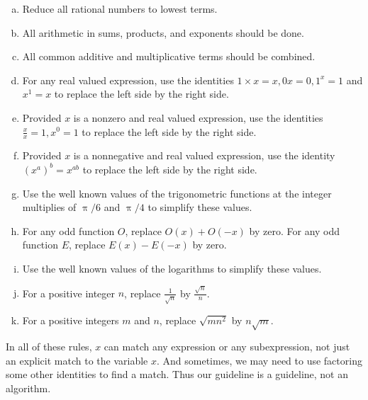 \documentclass[12pt,fleqn]{article}
\newenvironment{alphalist}{
  \begin{enumerate}[(a)]
    \addtolength{\itemsep}{-0.5\itemsep}}
  {\end{enumerate}}
\begin{document}
\begin{tcolorbox}
\begin{alphalist}

\item  Reduce all rational numbers to lowest terms.

\item All arithmetic in sums, products, and exponents should be done.

\item All common additive and multiplicative terms should be combined.

\item For any real valued expression, use the identities  $1 \times x   = x ,  0  x = 0, 1^x = 1$ and  $x^1 =x$ to replace the left side by the right side.

\item Provided $x$ is a nonzero and real valued expression,  use the identities $\frac{x}{x} = 1, x^0 = 1$ to replace the left side by the right side.

\item Provided $x$ is a nonnegative and real valued expression, use the identity $\left(x^a\right)^b = x^{a b}$  to replace the left side by the right side.

\item Use the well known values of the trigonometric functions at the integer multiplies of $\uppi/6$ and $\uppi/4$ to simplify these values.

\item For any odd function $O$, replace $O(x) + O(-x)$ by zero. For any odd function $E$, replace $E(x) - E(-x)$ by zero.

\item Use the well known values of the logarithms to simplify these values.

\item For a positive integer $n$, replace $\frac{1}{\sqrt{n}}$ by $\frac{\sqrt{n}}{n}$.

\item For a positive integers $m$ and $n$, replace $\sqrt{m n^2}$ by $n \sqrt{m}$. 

\end{alphalist}
\end{tcolorbox}

\noindent In all of these rules, $x$ can match any expression or any subexpression, not just an explicit match to the variable $x$.  And sometimes, we may need to use factoring some other identities to find a match.  Thus our guideline is a guideline, not an algorithm.  
\end{document}
